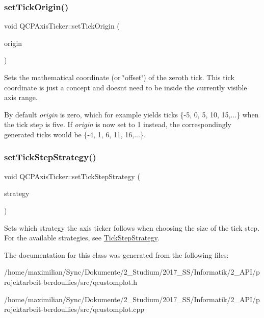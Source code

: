 \subsubsection{\texorpdfstring{set\+Tick\+Origin()}{setTickOrigin()}}
{\footnotesize\ttfamily void Q\+C\+P\+Axis\+Ticker\+::set\+Tick\+Origin (\begin{DoxyParamCaption}\item[{double}]{origin }\end{DoxyParamCaption})}

Sets the mathematical coordinate (or \char`\"{}offset\char`\"{}) of the zeroth tick. This tick coordinate is just a concept and doesn\textquotesingle{}t need to be inside the currently visible axis range.

By default {\itshape origin} is zero, which for example yields ticks \{-\/5, 0, 5, 10, 15,...\} when the tick step is five. If {\itshape origin} is now set to 1 instead, the correspondingly generated ticks would be \{-\/4, 1, 6, 11, 16,...\}. \mbox{\label{class_q_c_p_axis_ticker_a73b1d847c1a12159af6bfda4ebebe7d5}} 
\subsubsection{\texorpdfstring{set\+Tick\+Step\+Strategy()}{setTickStepStrategy()}}
{\footnotesize\ttfamily void Q\+C\+P\+Axis\+Ticker\+::set\+Tick\+Step\+Strategy (\begin{DoxyParamCaption}\item[{\hyperlink{class_q_c_p_axis_ticker_ab6d2f9d9477821623ac9bc4b21ddf49a}{Q\+C\+P\+Axis\+Ticker\+::\+Tick\+Step\+Strategy}}]{strategy }\end{DoxyParamCaption})}

Sets which strategy the axis ticker follows when choosing the size of the tick step. For the available strategies, see \hyperlink{class_q_c_p_axis_ticker_ab6d2f9d9477821623ac9bc4b21ddf49a}{Tick\+Step\+Strategy}. 

The documentation for this class was generated from the following files\+:\begin{DoxyCompactItemize}
\item 
/home/maximilian/\+Sync/\+Dokumente/2\+\_\+\+Studium/2017\+\_\+\+S\+S/\+Informatik/2\+\_\+\+A\+P\+I/projektarbeit-\/berdoullies/src/qcustomplot.\+h\item 
/home/maximilian/\+Sync/\+Dokumente/2\+\_\+\+Studium/2017\+\_\+\+S\+S/\+Informatik/2\+\_\+\+A\+P\+I/projektarbeit-\/berdoullies/src/qcustomplot.\+cpp\end{DoxyCompactItemize}
